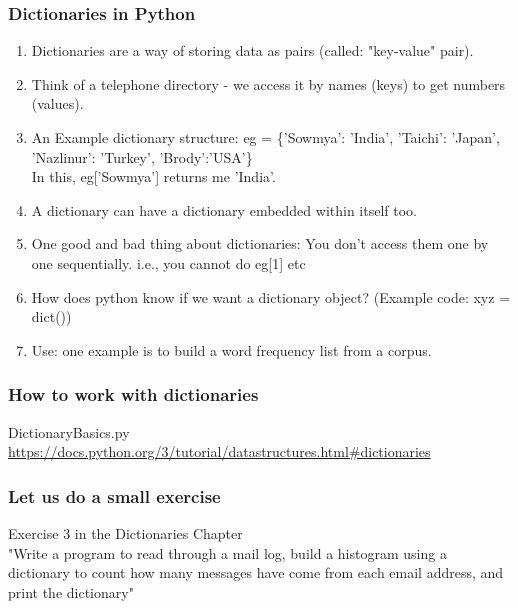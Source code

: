 \documentclass{beamer}
\begin{document}
\begin{frame}%
\frametitle{Dictionaries in Python}
\begin{enumerate}
\item Dictionaries are a way of storing data as pairs (called: "key-value" pair). \pause
\item Think of a telephone directory - we access it by names (keys) to get numbers (values). 
\item An Example dictionary structure: eg = \{'Sowmya': 'India', 'Taichi': 'Japan', 'Nazlinur': 'Turkey', 'Brody':'USA'\} \pause
\\ In this, eg['Sowmya'] returns me 'India'.
\item A dictionary can have a dictionary embedded within itself too.
\item One good and bad thing about dictionaries: You don't access them one by one sequentially. i.e., you cannot do eg[1] etc
\item How does python know if we want a dictionary object? (Example code: xyz = dict())
\item Use: one example is to build a word frequency list from a corpus. 
\end{enumerate}
\end{frame}

\begin{frame}[fragile] %
\frametitle{How to work with dictionaries}
DictionaryBasics.py \tiny
\\ \url{https://docs.python.org/3/tutorial/datastructures.html#dictionaries}
\end{frame} 

\begin{frame}
\frametitle{Let us do a small exercise}
Exercise 3 in the Dictionaries Chapter
\\ "Write a program to read through a mail log, build a histogram using a dictionary to count how many messages have come from each email address, and print the dictionary"
\end{frame} 
\end{document}
